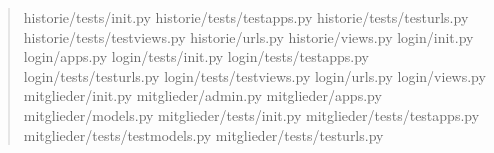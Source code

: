 \documentclass[letterpaper,10pt,english]{sphinxmanual}
\begin{document}
\begin{quote}
\begin{sphinxVerbatim}[commandchars=\\\{\}]
historie/tests/\PYGZus{}\PYGZus{}init\PYGZus{}\PYGZus{}.py                                  \PYGZpc{}
historie/tests/test\PYGZus{}apps.py                                 \PYGZpc{}
historie/tests/test\PYGZus{}urls.py                                 \PYGZpc{}
historie/tests/test\PYGZus{}views.py                               \PYGZpc{}
historie/urls.py                                            \PYGZpc{}
historie/views.py                                         \PYGZpc{}
login/\PYGZus{}\PYGZus{}init\PYGZus{}\PYGZus{}.py                                           \PYGZpc{}
login/apps.py                                               \PYGZpc{}
login/tests/\PYGZus{}\PYGZus{}init\PYGZus{}\PYGZus{}.py                                     \PYGZpc{}
login/tests/test\PYGZus{}apps.py                                    \PYGZpc{}
login/tests/test\PYGZus{}urls.py                                   \PYGZpc{}
login/tests/test\PYGZus{}views.py                                  \PYGZpc{}
login/urls.py                                               \PYGZpc{}
login/views.py                                              \PYGZpc{}
mitglieder/\PYGZus{}\PYGZus{}init\PYGZus{}\PYGZus{}.py                                      \PYGZpc{}
mitglieder/admin.py                                         \PYGZpc{}
mitglieder/apps.py                                          \PYGZpc{}
mitglieder/models.py                                        \PYGZpc{}
mitglieder/tests/\PYGZus{}\PYGZus{}init\PYGZus{}\PYGZus{}.py                                \PYGZpc{}
mitglieder/tests/test\PYGZus{}apps.py                               \PYGZpc{}
mitglieder/tests/test\PYGZus{}models.py                            \PYGZpc{}
mitglieder/tests/test\PYGZus{}urls.py                              \PYGZpc{}

\end{sphinxVerbatim}
\end{quote}
\end{document}
